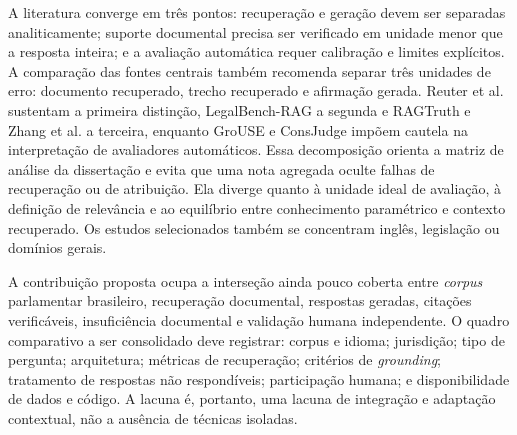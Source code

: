 A literatura converge em três pontos: recuperação e geração devem ser separadas analiticamente; suporte documental precisa ser
verificado em unidade menor que a resposta inteira; e a avaliação automática requer calibração e limites explícitos.
A comparação das fontes centrais também recomenda separar três unidades de erro: documento recuperado, trecho recuperado e
afirmação gerada. Reuter et al. sustentam a primeira distinção, LegalBench-RAG a segunda e RAGTruth e Zhang et al. a terceira,
enquanto GroUSE e ConsJudge impõem cautela na interpretação de avaliadores automáticos. Essa decomposição orienta a matriz de análise
da dissertação e evita que uma nota agregada oculte falhas de recuperação ou de atribuição. Ela diverge quanto à unidade ideal de
avaliação, à definição de relevância e ao equilíbrio entre conhecimento paramétrico e contexto recuperado. Os estudos selecionados
também se concentram  inglês, legislação ou domínios gerais.

A contribuição proposta ocupa a interseção ainda pouco coberta entre \textit{corpus} parlamentar brasileiro, recuperação documental,
respostas geradas, citações verificáveis, insuficiência documental e validação humana independente. O quadro comparativo a ser
consolidado deve registrar: corpus e idioma; jurisdição; tipo de pergunta; arquitetura; métricas de recuperação; critérios de
\textit{grounding}; tratamento de respostas não respondíveis; participação humana; e disponibilidade de dados e código. A lacuna é, portanto, uma lacuna de integração e adaptação contextual, não a ausência de técnicas isoladas.
